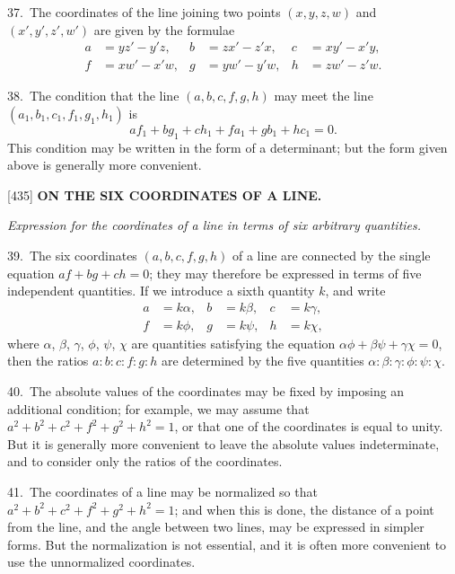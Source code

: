 \documentclass[12pt,a4paper]{article}
\newcommand{\paperref}[1]{\textup{[#1]}}
\theoremstyle{definition}
\begin{document}
37.~The coordinates of the line joining two points $(x, y, z, w)$ and $(x', y', z', w')$ are given by the formulae
\begin{align*}
a &= y z' - y' z, & b &= z x' - z' x, & c &= x y' - x' y,\\
f &= x w' - x' w, & g &= y w' - y' w, & h &= z w' - z' w.
\end{align*}

38.~The condition that the line $(a, b, c, f, g, h)$ may meet the line $(a_1, b_1, c_1, f_1, g_1, h_1)$ is
\[
a f_1 + b g_1 + c h_1 + f a_1 + g b_1 + h c_1 = 0.
\]
This condition may be written in the form of a determinant; but the form given above is generally more convenient.

\newpage
\setcounter{page}{81}

\noindent\paperref{435}\quad
\textbf{ON THE SIX COORDINATES OF A LINE.}

\textit{Expression for the coordinates of a line in terms of six arbitrary quantities.}

39.~The six coordinates $(a, b, c, f, g, h)$ of a line are connected by the single equation $af + bg + ch = 0$; they may therefore be expressed in terms of five independent quantities. If we introduce a sixth quantity $k$, and write
\begin{align*}
a &= k \alpha, & b &= k \beta, & c &= k \gamma,\\
f &= k \phi, & g &= k \psi, & h &= k \chi,
\end{align*}
where $\alpha$, $\beta$, $\gamma$, $\phi$, $\psi$, $\chi$ are quantities satisfying the equation $\alpha\phi + \beta\psi + \gamma\chi = 0$, then the ratios $a : b : c : f : g : h$ are determined by the five quantities $\alpha : \beta : \gamma : \phi : \psi : \chi$.

40.~The absolute values of the coordinates may be fixed by imposing an additional condition; for example, we may assume that $a^2 + b^2 + c^2 + f^2 + g^2 + h^2 = 1$, or that one of the coordinates is equal to unity. But it is generally more convenient to leave the absolute values indeterminate, and to consider only the ratios of the coordinates.

41.~The coordinates of a line may be normalized so that $a^2 + b^2 + c^2 + f^2 + g^2 + h^2 = 1$; and when this is done, the distance of a point from the line, and the angle between two lines, may be expressed in simpler forms. But the normalization is not essential, and it is often more convenient to use the unnormalized coordinates.
\end{document}
